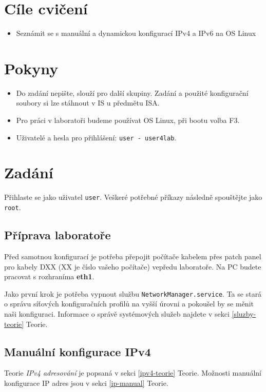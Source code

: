\section*{Cíle cvičení}
\begin{itemize}
    \item Seznámit se s manuální a dynamickou konfigurací IPv4 a IPv6 na OS Linux
\end{itemize}

\section*{Pokyny}
\begin{itemize}
    \item Do zadání nepište, slouží pro další skupiny. Zadání a použité
        konfigurační soubory si lze stáhnout v IS u předmětu ISA.
    \item Pro práci v laboratoři budeme používat OS Linux, při bootu volba F3.
    \item Uživatelé a hesla pro přihlášení: \texttt{user - user4lab}.
\end{itemize}

\section{Zadání}
Přihlaste se jako uživatel \texttt{user}. Veškeré potřebné příkazy následně
spouštějte jako \texttt{root}.

\subsection{Příprava laboratoře}
Před samotnou konfigurací je potřeba přepojit počítače kabelem přes patch panel
pro kabely DXX (XX je číslo vašeho počítače) vepředu laboratoře. Na PC budete
pracovat s rozhraníma {\bf eth1}.

Jako první krok je potřeba vypnout službu \texttt{NetworkManager.service}. Ta
se stará o správu síťových konfiguračních profilů na vyšší úrovni a pokoušel by
se měnit naši konfiguraci. Informace o správě systémových služeb najdete v
sekci \ref{sluzby-teorie} Teorie.

\subsection{Manuální konfigurace IPv4}

Teorie \emph{IPv4 adresování} je popsaná v sekci \ref{ipv4-teorie} Teorie.
Možnosti manuální konfigurace IP adres jsou v sekci \ref{ip-manual} Teorie.

